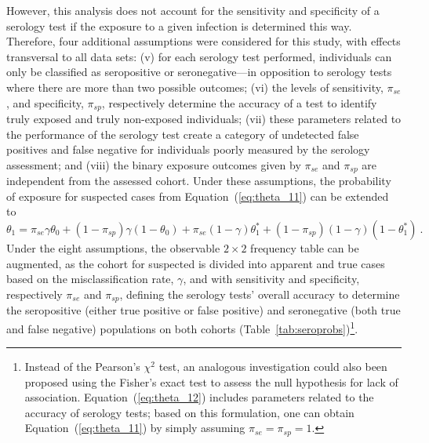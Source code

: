 However, this analysis does not account for the sensitivity and specificity of a serology test if the exposure to a given infection is determined this way. Therefore, four additional assumptions were considered for this study, with effects transversal to all data sets: (v) for each serology test performed, individuals can only be classified as seropositive or seronegative---in opposition to serology tests where there are more than two possible outcomes; (vi) the levels of sensitivity, $\pi_{se}$, and specificity, $\pi_{sp}$, respectively determine the accuracy of a test to identify truly exposed and truly non-exposed individuals; (vii) these parameters related to the performance of the serology test create a category of undetected false positives and false negative for individuals poorly measured by the serology assessment; and (viii) the binary exposure outcomes given by $\pi_{se}$ and $\pi_{sp}$ are independent from the assessed cohort. Under these assumptions, the probability of exposure for suspected cases from Equation~(\ref{eq:theta_11}) can be extended to
% 
\begin{equation}
    \theta_{1} = \pi_{se}\gamma\theta_{0} + (1-\pi_{sp})\gamma(1-\theta_{0}) + \pi_{se}(1-\gamma)\theta_{1}^* + (1-\pi_{sp})(1-\gamma)(1-\theta_{1}^*)\ .
    \label{eq:theta_12}
\end{equation}
% 
Under the eight assumptions, the observable $2 \times 2$ frequency table can be augmented, as the cohort for suspected \cfs is divided into apparent and true cases based on the misclassification rate, $\gamma$, and with sensitivity and specificity, respectively $\pi_{se}$ and $\pi_{sp}$, defining the serology tests' overall accuracy to determine the seropositive (either true positive or false positive) and seronegative (both true and false negative) populations on both cohorts (Table~\ref{tab:seroprobs})\footnote{Instead of the Pearson's $\chi^2$ test, an analogous investigation could also been proposed using the Fisher's exact test to assess the null hypothesis for lack of association. Equation~(\ref{eq:theta_12}) includes parameters related to the accuracy of serology tests; based on this formulation, one can obtain Equation~(\ref{eq:theta_11}) by simply assuming $\pi_{se} = \pi_{sp} = 1$.}.

